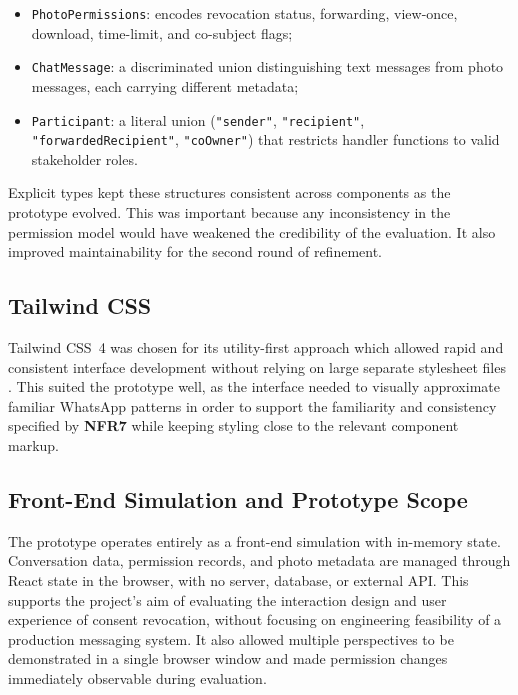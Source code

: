 \begin{itemize}
  \item \texttt{PhotoPermissions}: encodes revocation status, forwarding, view-once, download, time-limit, and co-subject flags;
  \item \texttt{ChatMessage}: a discriminated union distinguishing text messages from photo messages, each carrying different metadata;
  \item \texttt{Participant}: a literal union (\texttt{"sender"}, \texttt{"recipient"}, \texttt{"forwardedRecipient"}, \texttt{"coOwner"}) that restricts handler functions to valid stakeholder roles.
\end{itemize}

\noindent
Explicit types kept these structures consistent across components as the prototype evolved. This was important because any inconsistency in the permission model would have weakened the credibility of the evaluation. It also improved maintainability for the second round of refinement.

\subsection*{Tailwind CSS}

Tailwind CSS~4 was chosen for its utility-first approach which allowed rapid and consistent interface development without relying on large separate stylesheet files \cite{tailwindcss_docs}. This suited the prototype well, as the interface needed to visually approximate familiar WhatsApp patterns in order to support the familiarity and consistency specified by \textbf{NFR7} while keeping styling close to the relevant component markup.


\subsection*{Front-End Simulation and Prototype Scope}
The prototype operates entirely as a front-end simulation with in-memory state. Conversation data, permission records, and photo metadata are managed through React state in the browser, with no server, database, or external API. This supports the project’s aim of evaluating the interaction design and user experience of consent revocation, without focusing on engineering feasibility of a production messaging system. It also allowed multiple perspectives to be demonstrated in a single browser window and made permission changes immediately observable during evaluation.

